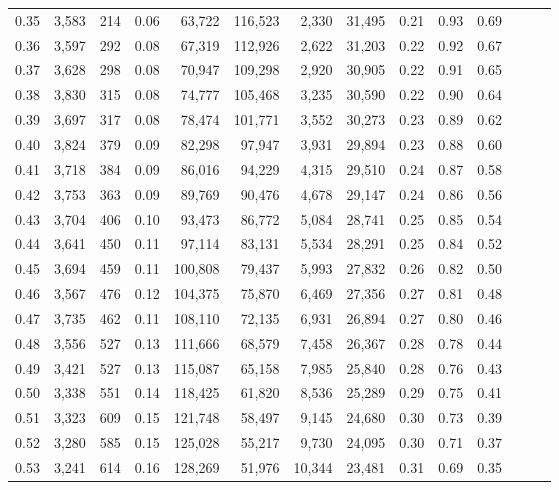 \begin{tabular}{rrrrrrrrrrrrrr}
0.35 &  3,583 &  214 &  0.06 &   63,722 &  116,523 &   2,330 &  31,495 &  0.21 &  0.93 &      0.69 \\
0.36 &  3,597 &  292 &  0.08 &   67,319 &  112,926 &   2,622 &  31,203 &  0.22 &  0.92 &      0.67 \\
0.37 &  3,628 &  298 &  0.08 &   70,947 &  109,298 &   2,920 &  30,905 &  0.22 &  0.91 &      0.65 \\
0.38 &  3,830 &  315 &  0.08 &   74,777 &  105,468 &   3,235 &  30,590 &  0.22 &  0.90 &      0.64 \\
0.39 &  3,697 &  317 &  0.08 &   78,474 &  101,771 &   3,552 &  30,273 &  0.23 &  0.89 &      0.62 \\
0.40 &  3,824 &  379 &  0.09 &   82,298 &   97,947 &   3,931 &  29,894 &  0.23 &  0.88 &      0.60 \\
0.41 &  3,718 &  384 &  0.09 &   86,016 &   94,229 &   4,315 &  29,510 &  0.24 &  0.87 &      0.58 \\
0.42 &  3,753 &  363 &  0.09 &   89,769 &   90,476 &   4,678 &  29,147 &  0.24 &  0.86 &      0.56 \\
0.43 &  3,704 &  406 &  0.10 &   93,473 &   86,772 &   5,084 &  28,741 &  0.25 &  0.85 &      0.54 \\
0.44 &  3,641 &  450 &  0.11 &   97,114 &   83,131 &   5,534 &  28,291 &  0.25 &  0.84 &      0.52 \\
0.45 &  3,694 &  459 &  0.11 &  100,808 &   79,437 &   5,993 &  27,832 &  0.26 &  0.82 &      0.50 \\
0.46 &  3,567 &  476 &  0.12 &  104,375 &   75,870 &   6,469 &  27,356 &  0.27 &  0.81 &      0.48 \\
0.47 &  3,735 &  462 &  0.11 &  108,110 &   72,135 &   6,931 &  26,894 &  0.27 &  0.80 &      0.46 \\
0.48 &  3,556 &  527 &  0.13 &  111,666 &   68,579 &   7,458 &  26,367 &  0.28 &  0.78 &      0.44 \\
0.49 &  3,421 &  527 &  0.13 &  115,087 &   65,158 &   7,985 &  25,840 &  0.28 &  0.76 &      0.43 \\
0.50 &  3,338 &  551 &  0.14 &  118,425 &   61,820 &   8,536 &  25,289 &  0.29 &  0.75 &      0.41 \\
0.51 &  3,323 &  609 &  0.15 &  121,748 &   58,497 &   9,145 &  24,680 &  0.30 &  0.73 &      0.39 \\
0.52 &  3,280 &  585 &  0.15 &  125,028 &   55,217 &   9,730 &  24,095 &  0.30 &  0.71 &      0.37 \\
0.53 &  3,241 &  614 &  0.16 &  128,269 &   51,976 &  10,344 &  23,481 &  0.31 &  0.69 &      0.35 \\

\end{tabular}
